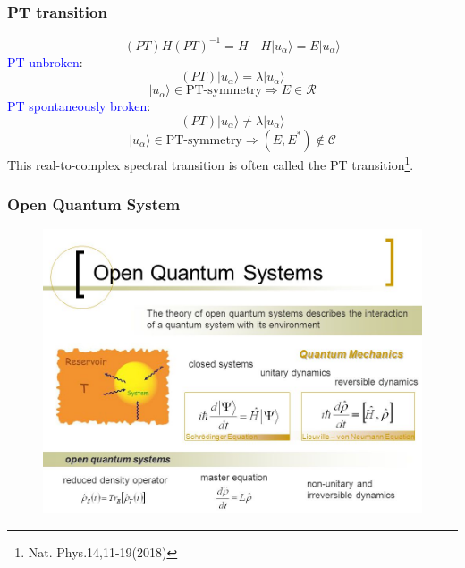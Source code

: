 \documentclass{beamer}
\begin{document}
\begin{frame}
\frametitle{PT transition}
\begin{equation}
(PT)H(PT)^{-1}=H\quad H|u_\alpha\rangle=E|u_\alpha\rangle
\end{equation}
\textcolor{blue}{PT unbroken}:
\begin{equation}
(PT)|u_\alpha\rangle=\lambda|u_\alpha\rangle
\end{equation}
$$|u_\alpha\rangle\in \textrm{PT-symmetry}\Rightarrow E\in\mathcal{R}	$$
\textcolor{blue}{PT spontaneously broken}:
\begin{equation}
(PT)|u_\alpha\rangle\neq\lambda|u_\alpha\rangle
\end{equation}
$$|u_\alpha\rangle\in \textrm{PT-symmetry}\Rightarrow (E,E^*)\notin\mathcal{C}$$
This real-to-complex spectral transition
is often called the PT transition\footnote{Nat. Phys.14,11-19(2018)}.
\end{frame}
\begin{frame}
\frametitle{Open Quantum System}
\begin{figure}
	\includegraphics[scale=0.4]{figure/OQS.jpg}
\end{figure}
\end{frame}
\end{document}
